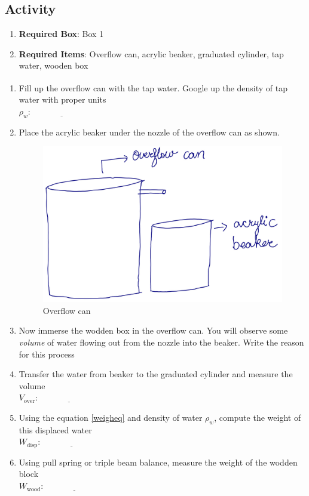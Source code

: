 \documentclass[10pt]{article}
\begin{document}
\subsection{Activity}
\begin{enumerate}
\item \textbf{Required Box}: Box 1
\item \textbf{Required Items}: Overflow can, acrylic beaker, graduated cylinder, tap water, wooden box
\end{enumerate}
\begin{enumerate}
\item Fill up the overflow can with the tap water.  Google\textsuperscript{\texttrademark} up the density of tap water with proper units\\
$\rho_{w}:\underline{\hspace{3cm}}$ 
\item Place the acrylic beaker under the nozzle of the overflow can as shown.
\begin{figure}[h]
\includegraphics[scale=.3]{overflowcan}
\centering
\caption{Overflow can}
\label{pgate}
\centering
\end{figure}
\item Now immerse the wodden box in the overflow can.  You will observe some \emph{volume} of water flowing out from the nozzle into the beaker.   Write the reason for this process 
\vspace{250px}
\item Transfer the water from beaker to the graduated cylinder and measure the volume\\
$V_{\text{over}}:\underline{\hspace{3cm}}$
\item Using the equation \ref{weigheq} and density of water $\rho_{w}$, compute the weight of this displaced water
\vspace{150px}\\
$W_{\text{disp}}:\underline{\hspace{3cm}}$
\item Using pull spring or triple beam balance, measure the weight of the wodden block\\
$W_{\text{wood}}:\underline{\hspace{3cm}}$
\end{enumerate}
\end{document}
